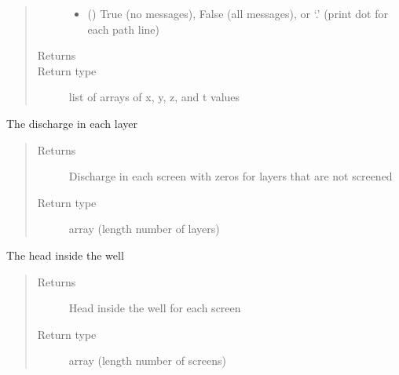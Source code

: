 \documentclass[letterpaper,10pt,english]{sphinxmanual}
\begin{document}
\begin{fulllineitems}
\begin{fulllineitems}
\begin{quote}
\begin{description}
\begin{itemize}
\item {} 
 () \textendash{} True (no messages), False (all messages), or ‘.’
(print dot for each path line)

\end{itemize}

\item[{Returns}] \leavevmode
{}

\item[{Return type}] \leavevmode
list of arrays of x, y, z, and t values

\end{description}\end{quote}

\end{fulllineitems}


\begin{fulllineitems}
\label{\detokenize{wells/headwell:timml.well.HeadWell.discharge}}
The discharge in each layer
\begin{quote}\begin{description}
\item[{Returns}] \leavevmode
Discharge in each screen with zeros for layers that are not
screened

\item[{Return type}] \leavevmode
array (length number of layers)

\end{description}\end{quote}

\end{fulllineitems}


\begin{fulllineitems}
\label{\detokenize{wells/headwell:timml.well.HeadWell.headinside}}
The head inside the well
\begin{quote}\begin{description}
\item[{Returns}] \leavevmode
Head inside the well for each screen

\item[{Return type}] \leavevmode
array (length number of screens)


\end{description}
\end{quote}
\end{fulllineitems}
\end{fulllineitems}
\end{document}
